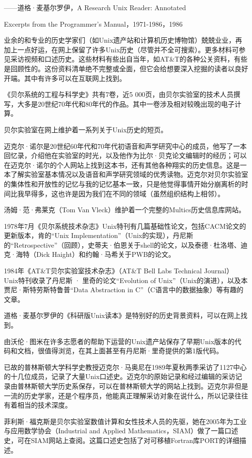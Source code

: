 \documentclass[a4paper,12pt,UTF8,twoside]{ctexbook}
\begin{document}
——道格·麦基尔罗伊，A Research Unix Reader: Annotated

Excerpts from the Programmer’s Manual，1971-1986，1986

业余的和专业的历史学家们（如Unix遗产站和计算机历史博物馆）兢兢业业，再加上一点好运，在网上保留了许多Unix历史（尽管并不全可搜索）。更多材料可参见采访视频和口述历史。这些材料有些出自当年，如AT\&T的各种公关资料，有些是回顾性的。这份资料清单绝不完整或全面，但它会给想要深入挖掘的读者以良好开端。其中有许多可以在互联网上找到。

《贝尔系统的工程与科学史》共有7卷，近5 000页，由贝尔实验室的技术人员撰写，大多是20世纪70年代和80年代的作品。其中一卷涉及相对较晚出现的电子计算。

贝尔实验室在网上维护着一系列关于Unix历史的短页。

迈克尔·诺尔是20世纪60年代和70年代初语音和声学研究中心的成员，他写了一本回忆录，介绍他在实验室的时光，以及他作为比尔·贝克论文编辑时的经历；可以在迈克尔·诺尔的个人网站上找到这本书，还有其他各种翔实的历史信息。这是一本了解实验室基本情况以及语音和声学研究领域的优秀读物。迈克尔对贝尔实验室的集体性和开放性的记忆与我的记忆基本一致，只是他觉得事情开始分崩离析的时间比我早得多，这也许是因为我们在不同的领域（虽然组织结构上相邻）。

汤姆·范·弗莱克（Tom Van Vleck）维护着一个完整的Multics历史信息库网站。

1978年7月《贝尔系统技术杂志》Unix特刊有几篇基础性论文，包括CACM论文的更新版本，肯的“Unix Implementation”（Unix的实现），丹尼斯的“Retrospective”（回顾），史蒂夫·伯恩关于shell的论文，以及泰德·杜洛塔、迪克·海特（Dick Haight）和约翰·马希关于PWB的论文。

1984年《AT\&T贝尔实验室技术杂志》（AT\&T Bell Labs Technical Journal） Unix特刊收录了丹尼斯 · 里奇的论文“Evolution of Unix”（Unix的演进），以及本贾尼·斯特劳斯特鲁普“Data Abstraction in C”（C语言中的数据抽象）等有趣的文章。

道格·麦基尔罗伊的《科研版Unix读本》是特别好的历史背景资料，可以在网上找到。

由沃伦·图米在许多志愿者的帮助下运营的Unix遗产站保存了早期Unix版本的代码和文档，很值得浏览，在其上面甚至有丹尼斯·里奇提供的第1版代码。

已故的普林斯顿大学科学史教授迈克尔·马奥尼在1989年夏秋两季采访了1127中心的十几位成员，记录了大量Unix口述史。迈克尔的原始记录和经过编辑的采访记录由普林斯顿大学历史系保存，可以在普林斯顿大学的网站上找到。迈克尔非但是一流的历史学家，还是个程序员，他能真正理解采访对象在说什么，所以记录往往有着相当的技术深度。

菲利斯·福克斯是贝尔实验室数值计算和女性技术人员的先驱，她在2005年为工业与应用数学协会（Industrial and Applied Mathematics，SIAM）做了一篇口述史，可在SIAM网站上查阅。这篇口述史包括了对可移植Fortran库PORT的详细描述。
\end{document}
